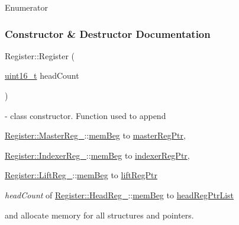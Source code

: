 {\begin{DoxyEnumFields}{Enumerator}
\end{DoxyEnumFields}


\subsubsection{Constructor \& Destructor Documentation}
\mbox{\label{classRegister_a2373bcab5c0881b7bc97f7e2863a816f}} 
{\footnotesize\ttfamily Register\+::\texorpdfstring{Register}{Register} (\begin{DoxyParamCaption}\item[{\mbox{\hyperlink{settings_8h_a017dd44e68049ffdd31500a8cd01ba68}{uint16\+\_\+t}}}]{head\+Count }\end{DoxyParamCaption})} - class constructor. Function used to append
\begin{DoxyCompactItemize}
\item \hyperlink{unionRegister_1_1MasterReg__}{Register\+::\+Master\+Reg\+\_\+}::\hyperlink{unionRegister_1_1MasterReg___a1753a4e5fb7c7ea404794200f06844d0}{mem\+Beg} to \hyperlink{classRegister_a57e680b6239c2b14a00b80bfab9fae77}{master\+Reg\+Ptr}, 
\item \hyperlink{unionRegister_1_1IndexerReg__}{Register\+::\+Indexer\+Reg\+\_\+}::\hyperlink{unionRegister_1_1IndexerReg___ab61397dfa5cf6bbc29d9642c3875967f}{mem\+Beg} to \hyperlink{classRegister_a6eec5512adfc9fb838b852de83eec936}{indexer\+Reg\+Ptr}, 
\item \hyperlink{unionRegister_1_1LiftReg__}{Register\+::\+Lift\+Reg\+\_\+}::\hyperlink{unionRegister_1_1LiftReg___a300648c78c7d8c50321d1c3da48ba591}{mem\+Beg} to \hyperlink{classRegister_a3ffd2d5dcaad7556d2294695f3aa1b13}{lift\+Reg\+Ptr}
\item \textit{headCount} of \hyperlink{unionRegister_1_1HeadReg__}{Register\+::\+Head\+Reg\+\_\+}::\hyperlink{unionRegister_1_1HeadReg___a0ec342c05f7dc7716557d9b2cef7dfd6}{mem\+Beg} to \hyperlink{classRegister_a380d6cf2ae7d1daf2233d1f3a4071426}{head\+Reg\+Ptr\+List}
\end{DoxyCompactItemize}
and allocate memory for all structures and pointers. 



}
